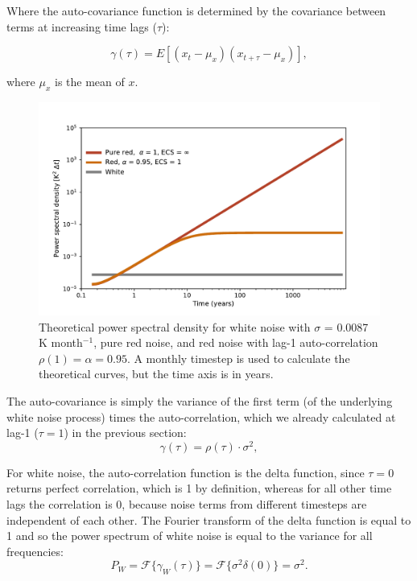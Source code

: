 \documentclass[12pt]{book}
\begin{document}
Where the auto-covariance function is determined by the covariance between terms at increasing time lags ($\tau$):

\begin{equation}
\gamma(\tau) = E\left[ (x_t - \mu_x) (x_{t+\tau} - \mu_x)\right] ,
\label{eqn_autoco}
\end{equation}

where $\mu_x$ is the mean of $x$.
\begin{figure}
	\begin{center}
		\includegraphics[width=16 cm]{../plots/Variability04.pdf}
	\end{center}
	\caption{Theoretical power spectral density for white noise with $\sigma$ = 0.0087 K month$^{-1}$, pure red noise, and red noise with lag-1 auto-correlation $\rho(1) = \alpha=0.95$. A monthly timestep is used to calculate the theoretical curves, but the time axis is in years. } 
	\label{fig:variability_04}
\end{figure}

The auto-covariance is simply the variance of the first term (of the underlying white noise process) times the auto-correlation, which we already calculated at lag-1 ($\tau=1$) in the previous section:
\begin{equation}
\gamma(\tau) = \rho(\tau) \cdot \sigma^2 ,
\label{eqn_autocorr}
\end{equation}

%

For white noise, the auto-correlation function is the delta function, since $\tau = 0$ returns perfect correlation, which is 1 by definition, whereas for all other time lags the correlation is 0, because noise terms from different timesteps are independent of each other. The Fourier transform of the delta function is equal to 1 and so the power spectrum of white noise is equal to the variance for all frequencies:
$$P_W = \mathcal{F}\{\gamma_W(\tau)\} =\mathcal{F}\{\sigma^2 \delta(0)\} = \sigma^2 .$$
\end{document}
